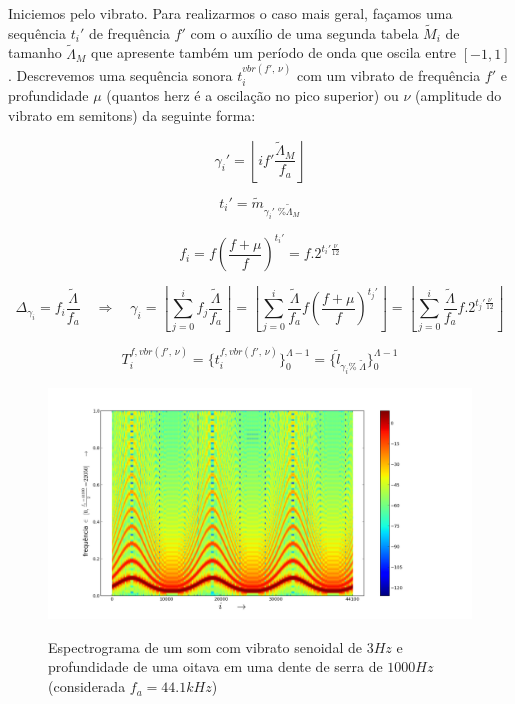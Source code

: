 Iniciemos pelo vibrato. Para realizarmos o caso mais geral, façamos uma sequência $t_i'$
de frequência $f'$ com o auxílio
de uma segunda tabela $\widetilde{M}_i$ de tamanho $\widetilde{\Lambda}_M$ que apresente também
um período de onda que oscila entre $[-1,1]$. Descrevemos uma sequência sonora $t_i^{vbr(f',\,\nu)}$ com
um vibrato de frequência $f'$ e profundidade  $\mu$ (quantos herz é a oscilação no pico superior)
ou $\nu$ (amplitude do vibrato em semitons) da seguinte forma:


\begin{equation}\label{vbrGamma}
\gamma_i'=\left \lfloor i f' \frac{\widetilde{\Lambda}_M}{f_a} \right \rfloor
\end{equation}

\begin{equation}\label{vbrAux}
t_i'=\widetilde{m}_{\gamma_i' \;\% \widetilde{\Lambda}_M}
\end{equation}

\begin{equation}\label{vbrF}
f_i=f \left ( \frac{f + \mu }{f} \right )^{t_i'}=f . 2^{t_i'\frac{\nu}{12}}
\end{equation}

\begin{equation}\label{vbrGamma}
\Delta_{\gamma_i}=f_i\frac{\widetilde{\Lambda}}{f_a} \quad \Rightarrow \quad \gamma_i = \left \lfloor \sum_{j=0}^{i} f_j \frac{\widetilde{\Lambda}}{f_a} \right \rfloor = \left \lfloor \sum_{j=0}^{i} \frac{\widetilde{\Lambda}}{f_a}f \left ( \frac{f + \mu }{f} \right )^{t_j'}  \right \rfloor= \left \lfloor \sum_{j=0}^{i} \frac{\widetilde{\Lambda}}{f_a}f . 2^{t_j'\frac{\nu}{12}}  \right \rfloor
\end{equation}

\begin{equation}\label{vbrT}
T_i^{f, vbr(f',\,\nu)}=\{ t_i^{f,vbr(f',\,\nu)} \}_0^{\Lambda-1}=\{ \widetilde{l}_{\gamma_i \%\; \widetilde{\Lambda} } \}_0^{\Lambda-1}
\end{equation}


\begin{figure}[h!]
    \centering
    \caption{Espectrograma de um som com vibrato senoidal de $3Hz$ e profundidade de uma oitava em uma dente de serra de $1000Hz$ (considerada $f_a=44.1kHz$)}
        \includegraphics[width=\textwidth]{figuras/vibrato___}
        \label{fig:vibrato}
\end{figure}

